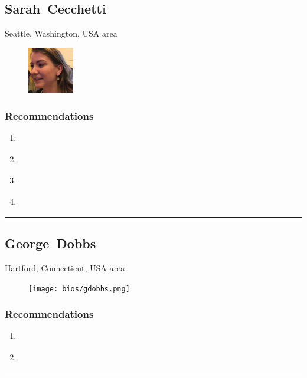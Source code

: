 \subsection{Sarah~Cecchetti} \textsf{Seattle, Washington, USA area} \par \setlength{\columnsep}{0pt} \begin{figure} \centering \includegraphics[width=0.18\textwidth]{bios/scecchetti.jpg} \end{figure}  \subsubsection{Recommendations}\begin{enumerate}
\item \cite{Gilman2017}
\item \cite{Hardt2005}
\item \cite{NSTIC2011}
\item \cite{Richer2017}
\end{enumerate}\noindent\rule{\textwidth}{0.2pt}

\subsection{George~Dobbs} \textsf{Hartford, Connecticut, USA area} \par \setlength{\columnsep}{0pt} \begin{figure} \centering \texttt{[image: bios/gdobbs.png]} \end{figure}  \subsubsection{Recommendations}\begin{enumerate}
\item \cite{Cameron2005}
\item \cite{Hoffman1977}
\end{enumerate}\noindent\rule{\textwidth}{0.2pt}

